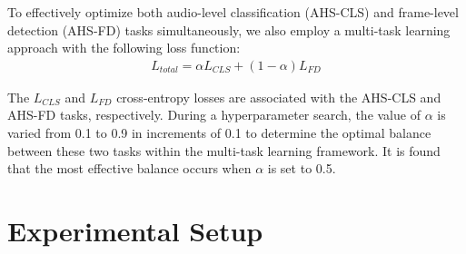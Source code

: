 \documentclass[11pt]{article}
\begin{document}


To effectively optimize both audio-level classification (AHS-CLS) and frame-level detection (AHS-FD) tasks simultaneously, we also employ a multi-task learning approach with the following loss function:
\begin{align}
\label{eq:multi}
L_{total}= \alpha L_{CLS}+ (1-\alpha) L_{FD}
\end{align}

The $L_{CLS}$ and $L_{FD}$ cross-entropy losses are associated with the AHS-CLS and AHS-FD tasks, respectively. During a hyperparameter search, the value of $\alpha$ is varied from 0.1 to 0.9 in increments of 0.1 to determine the optimal balance between these two tasks within the multi-task learning framework. It is found that the most effective balance occurs when $\alpha$ is set to 0.5.










\section{Experimental Setup}
\end{document}
